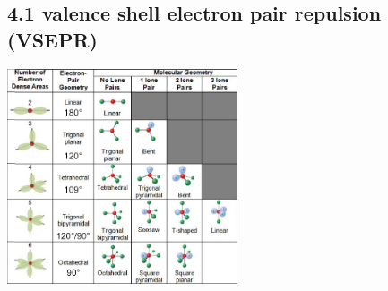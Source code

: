 \subsection{4.1 valence shell electron pair repulsion (VSEPR)}
    \centerline{\includegraphics[width=68mm]{src/4_Molecular_models/images/VSEPER.PNG}}